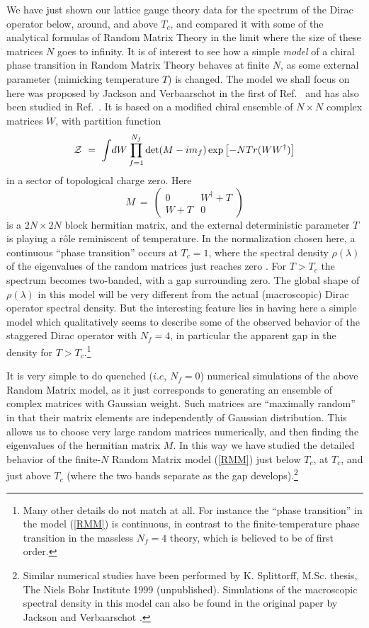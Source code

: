 \documentclass[11pt]{article}
\newcommand{\beq}{\begin{equation}}
\newcommand{\eeq}{\end{equation}}
\newcommand{\noi}{\vspace{12pt}\noindent}
\begin{document}
We have just shown our lattice gauge theory data for the spectrum of the
Dirac operator below, around, and above $T_c$, and compared it with
some of the analytical formulas of Random Matrix Theory in the limit
where the size of these matrices $N$ goes to infinity. It is of interest
to see how a simple {\em model} of a chiral phase transition in Random
Matrix Theory behaves at finite $N$, as some external parameter (mimicking
temperature $T$) is changed. The model we shall focus on here
was proposed by Jackson and Verbaarschot in the first of Ref.~\cite{JV}
and has also been studied in Ref.~\cite{Tilo}. 
It is based on a modified chiral ensemble
of $N\times N$ complex matrices $W$, with partition function 
\beq
{\cal Z} ~=~ \int\! dW \prod_{f=1}^{N_{f}}\det(M - im_f) \exp\left[-N
Tr(WW^{\dagger})\right] \label{RMM} 
\eeq
in a sector of topological charge zero. Here  
\beq
M ~=~ \left( \begin{array}{cc}
              0 & W^{\dagger} + T\\
              W + T & 0
              \end{array}
      \right)
\eeq
is a $2N\times 2N$ 
block hermitian matrix, and the external deterministic parameter $T$
is playing a r\^{o}le reminiscent of temperature. In the 
normalization chosen here, a continuous ``phase transition'' occurs at
$T_c = 1$, where the spectral density $\rho(\lambda)$ of the eigenvalues
of the random matrices just reaches zero \cite{JV}. For $T > T_c$ the
spectrum becomes two-banded, with a gap surrounding zero. The global shape 
of $\rho(\lambda)$ in this model will be very
different from the actual (macroscopic) Dirac operator spectral density. But
the interesting feature lies in having here a simple model which qualitatively
seems to describe some of the observed behavior of the staggered Dirac operator
with $N_f=4$, in particular the apparent
gap in the density for $T > T_c$.\footnote{Many other details do not match
at all. For instance the ``phase transition'' in the model (\ref{RMM}) is
continuous, in contrast to the finite-temperature phase transition in the 
massless $N_f=4$ theory, which is believed to be of first order.} 

\noi
It is very simple to do quenched ($i.e$, $N_f=0$) 
numerical simulations of the above 
Random Matrix model, as it just corresponds to generating an ensemble
of complex matrices with Gaussian weight. Such matrices are ``maximally
random'' in that their matrix elements are independently of Gaussian 
distribution. This
allows us to choose very large random matrices numerically, and then 
finding the eigenvalues of the hermitian matrix $M$. In this way we have
studied the detailed behavior of the finite-$N$ Random Matrix model
(\ref{RMM}) just below $T_c$, at $T_c$, and just above $T_c$ (where the
two bands separate as the gap develops).\footnote{Similar numerical
studies have been performed by K. Splittorff, M.Sc. thesis, The Niels Bohr 
Institute 1999 (unpublished). Simulations of the
macroscopic spectral density in this model can also be found in the original
paper by Jackson and Verbaarschot \cite{JV}.}   
\end{document}
